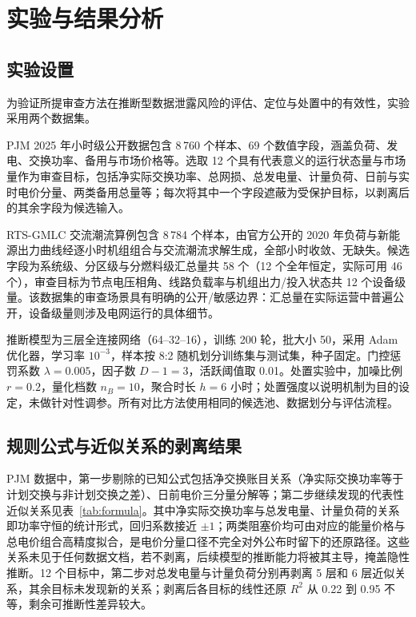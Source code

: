 \documentclass[UTF8,zihao=5,twoside,fontset=none]{ctexart}
\newcommand{\rev}[1]{{\color{blue}#1}}
\begin{document}
\section{实验与结果分析}

\subsection{实验设置}

\rev{为验证所提审查方法在推断型数据泄露风险的评估、定位与处置中的有效性，}实验采用两个数据集。

PJM 2025 年小时级公开数据\cite{ref-pjm-dataminer}包含 8\,760 个样本、69 个数值字段，涵盖负荷、发电、交换功率、备用与市场价格等。选取 12 个具有代表意义的运行状态量与市场量作为审查目标，包括净实际交换功率、总网损、总发电量、计量负荷、日前与实时电价分量、两类备用总量等；每次将其中一个字段遮蔽为受保护目标，以剥离后的其余字段为候选输入。

RTS-GMLC 交流潮流算例\cite{ref-rtsgmlc}包含 8\,784 个样本，由官方公开的 2020 年负荷与新能源出力曲线经逐小时机组组合与交流潮流求解生成，全部小时收敛、无缺失。候选字段为系统级、分区级与分燃料级汇总量共 58 个（12 个全年恒定，实际可用 46 个），审查目标为节点电压相角、线路负载率与机组出力/投入状态共 12 个设备级量。该数据集的审查场景具有明确的公开/敏感边界：汇总量在实际运营中普遍公开，设备级量则涉及电网运行的具体细节。

推断模型为三层全连接网络（64--32--16），训练 200 轮，批大小 50，采用 Adam 优化器\cite{ref-kingma-adam}，学习率 $10^{-3}$，样本按 8:2 随机划分训练集与测试集，种子固定。门控惩罚系数 $\lambda=0.005$，因子数 $D-1=3$，活跃阈值取 0.01。处置实验中，加噪比例 $r=0.2$，量化档数 $n_B=10$，聚合时长 $h=6$ 小时；处置强度以说明机制为目的设定，未做针对性调参。所有对比方法使用相同的候选池、数据划分与评估流程。

\subsection{规则公式与近似关系的剥离结果}

PJM 数据中，第一步剔除的已知公式包括净交换账目关系（净实际交换功率等于计划交换与非计划交换之差）、日前电价三分量分解等；第二步继续发现的代表性近似关系见表~\ref{tab:formula}。其中净实际交换功率与总发电量、计量负荷的关系即功率守恒的统计形式，回归系数接近 $\pm 1$；两类阻塞价均可由对应的能量价格与总电价组合高精度拟合，是电价分量口径不完全对外公布时留下的还原路径。这些关系未见于任何数据文档，若不剥离，后续模型的推断能力将被其主导，掩盖隐性推断。12 个目标中，第二步对总发电量与计量负荷分别再剥离 5 层和 6 层近似关系，其余目标未发现新的关系；剥离后各目标的线性还原 $R^2$ 从 0.22 到 0.95 不等，剩余可推断性差异较大。
\end{document}
